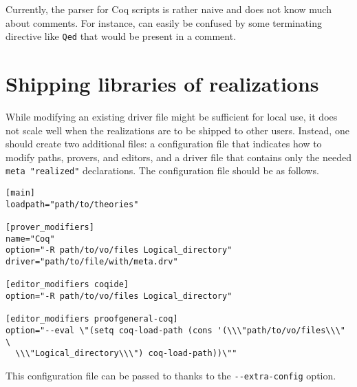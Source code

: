 Currently, the parser for Coq scripts is rather naive and does not know
much about comments. For instance, \why can easily be confused by
some terminating directive like \verb+Qed+ that would be present in a
comment.



\section{Shipping libraries of realizations}

While modifying an existing driver file might be sufficient for local
use, it does not scale well when the realizations are to be shipped to
other users. Instead, one should create two additional files: a
configuration file that indicates how to modify paths, provers, and
editors, and a driver file that contains only the needed
\verb+meta "realized"+ declarations. The configuration file should be as
follows.

\begin{verbatim}
[main]
loadpath="path/to/theories"

[prover_modifiers]
name="Coq"
option="-R path/to/vo/files Logical_directory"
driver="path/to/file/with/meta.drv"

[editor_modifiers coqide]
option="-R path/to/vo/files Logical_directory"

[editor_modifiers proofgeneral-coq]
option="--eval \"(setq coq-load-path (cons '(\\\"path/to/vo/files\\\" \
  \\\"Logical_directory\\\") coq-load-path))\""
\end{verbatim}

This configuration file can be passed to \why thanks to the
\verb+--extra-config+ option.


